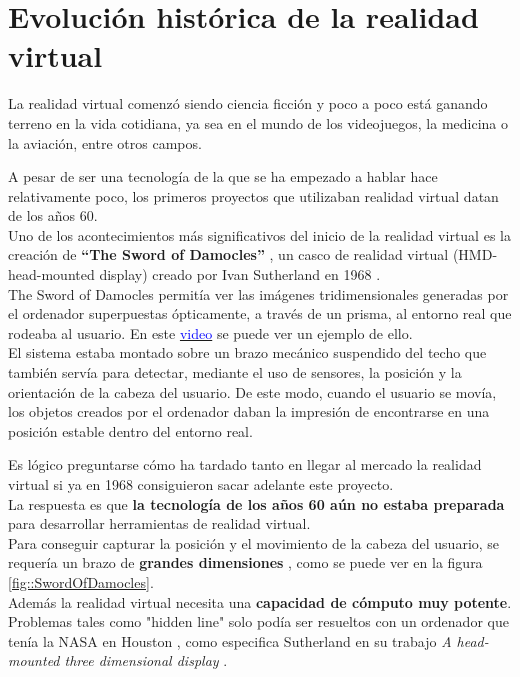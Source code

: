 \documentclass[twoside, 11pt]{epstfg}
\begin{document}
\section{Evolución histórica de la realidad virtual}
La realidad virtual comenzó siendo ciencia ficción y poco a poco está ganando terreno en la vida cotidiana, ya sea en el mundo de los videojuegos, la medicina o la aviación, entre otros campos.

A pesar de ser una tecnología de la que se ha empezado a hablar hace relativamente poco, los primeros proyectos que utilizaban realidad virtual datan de los años 60.\\
Uno de los  acontecimientos más significativos del inicio de la realidad virtual es la creación de \textbf{“The Sword of Damocles”} , un casco de realidad virtual (HMD- head-mounted display)  creado por Ivan Sutherland en 1968 \cite{Sutherland}.\\
The Sword of Damocles permitía ver las imágenes tridimensionales generadas por el
ordenador superpuestas ópticamente, a través de un prisma, al entorno real que rodeaba al usuario. En este \href{https://www.youtube.com/watch?v=ISJWZpFIAlQ}{\textcolor{blue}{video}} se puede ver un ejemplo de ello.\\
 El sistema estaba montado sobre un brazo mecánico suspendido del techo que también servía para detectar, mediante el uso de sensores, la posición y la orientación de la cabeza del usuario. De este modo, cuando el usuario se movía, los objetos creados por el ordenador daban la impresión de encontrarse en una posición estable dentro del entorno real.

Es lógico preguntarse cómo ha tardado tanto en llegar al mercado la realidad virtual si ya en 1968 consiguieron sacar adelante este proyecto.\\
La respuesta es que \textbf{la tecnología de los años 60 aún no estaba preparada} para desarrollar herramientas de realidad virtual.\\
Para conseguir capturar la posición y el movimiento de la cabeza del usuario, se requería un brazo de \textbf{grandes dimensiones} , como se puede ver en la figura \ref{fig::SwordOfDamocles}.\\
Además la realidad virtual necesita una \textbf{capacidad de cómputo muy potente}. Problemas tales como "hidden line" solo podía ser resueltos con un ordenador que tenía la NASA en Houston \cite{hedgley1982general}, como especifica Sutherland en su trabajo \textit{A head-mounted three dimensional display} \cite{Sutherland}. 
\end{document}
